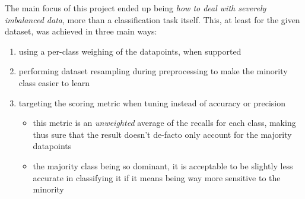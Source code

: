 \begin{frame}{\subsecname}
The main focus of this project ended up being \textit{how to deal with severely imbalanced data}, more than a classification task itself. This, at least for the given dataset, was achieved in three main ways:
\begin{enumerate}
    \justifying
    \small
    \item using a per-class weighing of the datapoints, when supported
    \item performing dataset resampling during preprocessing to make the minority class easier to learn
    \item targeting the  scoring metric when tuning instead of accuracy or precision
    \begin{itemize}
        \item this metric is an \textit{unweighted} average of the recalls for each class, making thus sure that the result doesn't de-facto only account for the majority datapoints
        \item the majority class being so dominant, it is acceptable to be slightly less accurate in classifying it if it means being way more sensitive to the minority
    \end{itemize}
\end{enumerate}

\end{frame}